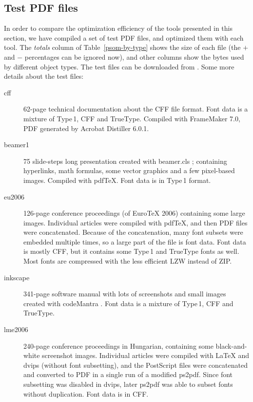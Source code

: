 \documentclass{ltugproc}
\def\cmd{\textsf}
\def\pkg{\textsf}
\begin{document}
\subsection{Test PDF files}

In order to compare the optimization efficiency of the tools presented in
this section, we have compiled a set of test PDF files, and optimized them
with each tool. The \emph{totals} column of Table~\ref{psom-by-type} shows
the size of each file (the $+$ and $-$ percentages can be ignored now), and
other columns show the bytes used by different object types. The test files
can be downloaded from \cite{example-pdfs}. Some more
details about the test files:

\begin{description}

\item[cff] 62-page technical documentation about the CFF file format. Font
data is a mixture of Type\,1, CFF and TrueType. Compiled with FrameMaker
7.0, PDF generated by Acrobat Distiller 6.0.1. 

\item[beamer1] 75 slide-steps long presentation created with
\pkg{beamer.cls} \cite{beamer}; containing hyperlinks, math formulas, some
vector graphics and a few pixel-based images. Compiled with pdf\TeX{}.
Font data is in Type\,1 format.

\item[eu2006] 126-page conference proceedings (of Euro\TeX{} 2006)
containing some large images. Individual articles were compiled with
pdf\TeX{}, and then PDF files were concatenated. Because of the
concatenation, many font subsets were embedded multiple times, so a large
part of the file is font data. Font data is mostly CFF, but it contains some
Type\,1 and TrueType fonts as well. Most fonts are compressed with the
less efficient LZW instead of ZIP.

\item[inkscape] 341-page software manual with lots of screenshots and small
images created with codeMantra \cite{codemantra}. Font data is a mixture of
Type\,1, CFF and TrueType.

\item[lme2006] 240-page conference proceedings in Hungarian, containing some
black-and-white screenshot images. Individual articles were compiled with
\LaTeX{} and \cmd{dvips} (without font subsetting), and the PostScript files
were concatenated and converted to PDF in a single run of a modified
\cmd{ps2pdf}. Since font subsetting was disabled in \cmd{dvips}, later
\cmd{ps2pdf} was able to subset fonts without duplication. Font data is in
CFF.


\end{description}
\end{document}
